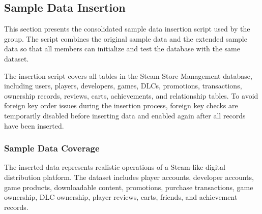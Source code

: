 \subsection{Sample Data Insertion}

This section presents the consolidated sample data insertion script used by the group. 
The script combines the original sample data and the extended sample data so that all members can initialize and test the database with the same dataset.

The insertion script covers all tables in the Steam Store Management database, including users, players, developers, games, DLCs, promotions, transactions, ownership records, reviews, carts, achievements, and relationship tables. 
To avoid foreign key order issues during the insertion process, foreign key checks are temporarily disabled before inserting data and enabled again after all records have been inserted.

\subsubsection{Sample Data Coverage}

The inserted data represents realistic operations of a Steam-like digital distribution platform. 
The dataset includes player accounts, developer accounts, game products, downloadable content, promotions, purchase transactions, game ownership, DLC ownership, player reviews, carts, friends, and achievement records.

